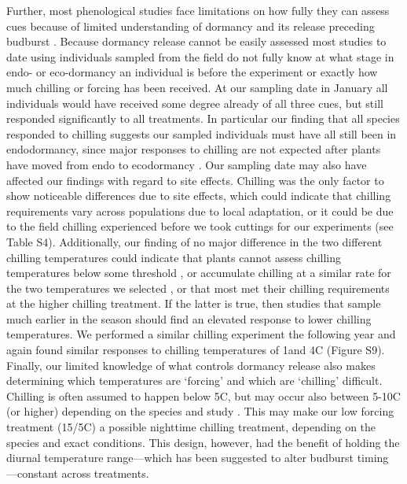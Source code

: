 \documentclass[11pt]{article}
\begin{document}
Further, most phenological studies face limitations on how fully they can assess cues because of limited understanding of dormancy and its release preceding budburst \citep{Cooke2012,chuine2016}. Because dormancy release cannot be easily assessed \citep{chuine2016} most studies to date using individuals sampled from the field do not fully know at what stage in endo- or eco-dormancy an individual is before the experiment or exactly how much chilling or forcing has been received. At our sampling date in January all individuals would have received some degree already of all three cues, but still responded significantly to all treatments. In particular our finding that all species responded to chilling suggests our sampled individuals must have all still been in endodormancy, since major responses to chilling are not expected after plants have moved from endo to ecodormancy \citep{chuine2016}. Our sampling date may also have affected our findings with regard to site effects. Chilling was the only factor to show noticeable differences due to site effects, which could indicate that chilling requirements vary across populations due to local adaptation, or it could be due to the field chilling experienced before we took cuttings for our experiments (see Table S4). Additionally, our finding of no major difference in the two different chilling temperatures could indicate that plants cannot assess chilling temperatures below some threshold \citep{coville1920,Harrington:2010,guy2014}, or accumulate chilling at a similar rate for the two temperatures we selected \citep[e.g.,][]{harrington2015}, or that most met their chilling requirements at the higher chilling treatment. If the latter is true, then studies that sample much earlier in the season should find an elevated response to lower chilling temperatures. We performed a similar chilling experiment the following year and again found similar responses to chilling temperatures of 1\degree and 4\degree C (Figure S9). Finally, our limited knowledge of what controls dormancy release also makes determining which temperatures are `forcing' and which are `chilling' difficult. Chilling is often assumed to happen below 5\degree C, but may occur also between 5-10\degree C (or higher) depending on the species and study \citep{Luedeling2013AgFM,harrington2015}. This may make our low forcing treatment (15/5\degree C) a possible nighttime chilling treatment, depending on the species and exact conditions. This design, however, had the benefit of holding the diurnal temperature range---which has been suggested to alter budburst timing \citep{rossi2017}---constant across treatments. \\ %
\end{document}
